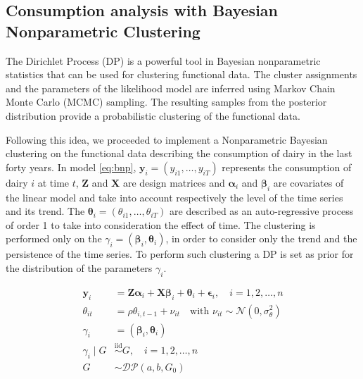 %



\subsection{Consumption analysis with Bayesian Nonparametric Clustering}

The Dirichlet Process (DP) is a powerful tool in Bayesian nonparametric statistics that can be used for clustering functional data.
The cluster assignments and the parameters of the likelihood model are inferred using Markov Chain Monte Carlo (MCMC) sampling. The resulting samples from the posterior distribution provide a probabilistic clustering of the functional data.

Following this idea, we proceeded to implement a Nonparametric Bayesian clustering on the functional data describing the consumption of dairy in the last forty years.
In model \eqref{eq:bnp}, $\mathbf{y}_i=(y_{i 1},\ldots,y_{i T})$ represents the consumption of dairy $i$ at time $t$, $\mathbf{Z}$ and $\mathbf{X}$ are design matrices and $\boldsymbol{\alpha}_i$ and $\boldsymbol{\beta}_i$ are covariates of the linear model and take into account respectively the level of the time series and its trend. The $\boldsymbol{\theta}_i=(\theta_{i 1},\ldots,\theta_{i T})$ are described as an auto-regressive process of order 1 to take into consideration the effect of time. The clustering is performed only on the $\gamma_i = \left(\boldsymbol{\beta}_i, \boldsymbol{\theta}_i\right)$, in order to consider only the trend and the persistence of the time series. To perform such clustering a DP is set as prior for the distribution of the parameters $\gamma_i$.

\begin{equation}
    \label{eq:bnp}
    \begin{aligned}
    \mathbf{y}_i & =\mathbf{Z} \boldsymbol{\alpha}_i+\mathbf{X} \boldsymbol{\beta}_i+\boldsymbol{\theta}_i+\boldsymbol{\epsilon}_i, \quad i=1,2, \ldots, n \\
    \theta_{i t} & =\rho \theta_{i, t-1}+\nu_{i t} \quad \text{with }\nu_{i t}\sim \mathcal{N}(0, \sigma_{\theta}^2)\\
    \gamma_i &= \left(\boldsymbol{\beta}_i, \boldsymbol{\theta}_i\right) \\
    \gamma_i \mid G & \stackrel{\text{iid}}{\sim} G, \quad i=1,2, \ldots, n \\
    G & \sim \mathcal{DP}\left(a, b, G_0\right)
    \end{aligned}
\end{equation}

